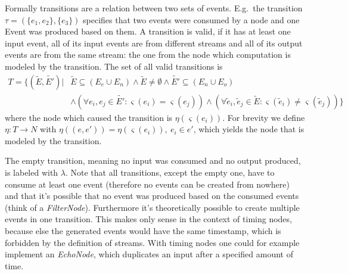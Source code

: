 Formally transitions are a relation between two sets of events.
E.g.\ the transition \(\tau = (\{e_1,e_2\}, \{e_3\})\) specifies that two events were consumed by a node and one Event was produced based on them.
A transition is valid, if it has at least one input event, all of its input events are from different streams and all of its output events are from the same stream: the one from the node which computation is modeled by the transition.
The set of all valid transitions is
\begin{align*}
  T = \{(\widetilde{E}, \widetilde{E'}) | &\widetilde{E} \subseteq (E_e \cup E_n) \land \widetilde{E} \neq \emptyset \land \widetilde{E'} \subseteq (E_n \cup E_o)\\
&\land (\forall e_i, e_j \in \widetilde{E'}: \varsigma(e_i) = \varsigma(e_j)) \land (\forall \widetilde{e}_i, \widetilde{e}_j \in \widetilde{E}: \varsigma(\widetilde{e}_i) \neq \varsigma(\widetilde{e}_j))\}
\end{align*}
where the node which caused the transition is \(\eta(\varsigma(e_i))\).
For brevity we define \(\eta : T \rightarrow N\) with \(\eta((e, e')) = \eta(\varsigma(e_i)),\ e_i \in e'\), which yields the node that is modeled by the transition.

The empty transition, meaning no input was consumed and no output produced, is labeled with \(\lambda\).
Note that all transitions, except the empty one, have to consume at least one event (therefore no events can be created from nowhere) and that it's possible that no event was produced based on the consumed events (think of a \emph{FilterNode}).
Furthermore it's theoretically possible to create multiple events in one transition.
This makes only sense in the context of timing nodes, because else the generated events would have the same timestamp, which is forbidden by the definition of streams.
With timing nodes one could for example implement an \emph{EchoNode}, which duplicates an input after a specified amount of time.

